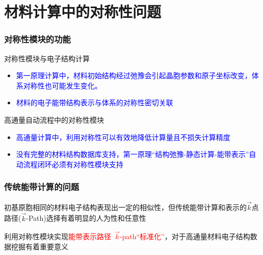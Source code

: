 \documentclass[cjk,slidestop,handout,compress,mathserif,blue]{beamer}	%
\begin{document}
\section{材料计算中的对称性问题}
\frame
{
	\frametitle{对称性模块的功能}
	对称性模块与电子结构计算
	\begin{itemize}
		\item \textcolor{blue}{第一原理计算中，材料初始结构经过弛豫会引起晶胞参数和原子坐标改变，体系对称性也可能发生变化。}
		\item \textcolor{blue}{材料的电子能带结构表示与体系的对称性密切关联}
	\end{itemize}
	\vskip 30pt
	高通量自动流程中的对称性模块
	\begin{itemize}
		\item \textcolor{blue}{高通量计算中，利用对称性可以有效地降低计算量且不损失计算精度}
		\item \textcolor{blue}{没有完整的材料结构数据库支持，第一原理“结构弛豫-静态计算-能带表示”自动流程闭环必须有对称性模块支持}
	\end{itemize}
}

\frame
{
	\frametitle{传统能带计算的问题}
	初基原胞相同的材料电子结构表现出一定的相似性，但传统能带计算和表示的$\vec k$点路径($\vec k$-\textrm{Path})选择有着明显的人为性和任意性
\begin{figure}[h!]
\centering
\hspace*{-0.30in}
\label{Band_Gap_BCC_GeF4}
\end{figure}
利用对称性模块实现\textcolor{red}{能带表示路径~$\vec k$-\textrm{path}“标准化”}，对于高通量材料电子结构数据挖掘有着重要意义
}
\end{document}
